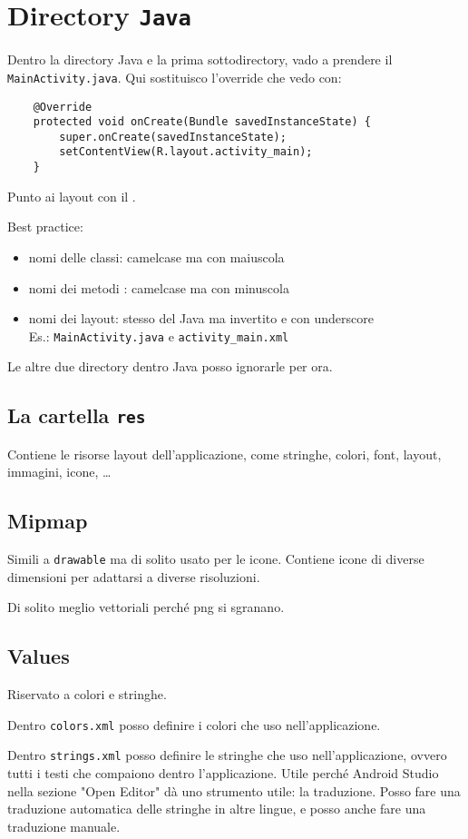 \section{Directory \texttt{Java}}
\par Dentro la directory Java e la prima sottodirectory, vado a prendere il \texttt{MainActivity.java}. Qui sostituisco l'override che vedo con:
\begin{verbatim}
    @Override
    protected void onCreate(Bundle savedInstanceState) {
        super.onCreate(savedInstanceState);
        setContentView(R.layout.activity_main);
    }
\end{verbatim}
\par Punto ai layout con il .
\par Best practice:
\begin{itemize}
    \item nomi delle classi: camelcase ma con maiuscola
    \item nomi dei metodi : camelcase ma con minuscola
    \item nomi dei layout: stesso del Java ma invertito e con underscore\\
    Es.: \texttt{MainActivity.java} e \texttt{activity\_main.xml}
\end{itemize}
\par Le altre due directory dentro Java posso ignorarle per ora.

\subsection{La cartella \texttt{res}}
\par Contiene le risorse layout dell'applicazione, come stringhe, colori, font, layout, immagini, icone, \dots

\subsection{Mipmap}
\par Simili a \texttt{drawable} ma di solito usato per le icone. Contiene icone di diverse dimensioni per adattarsi a diverse risoluzioni. 
\par Di solito meglio vettoriali perché png si sgranano.

\subsection{Values}
\par Riservato a colori e stringhe. 
\par Dentro \texttt{colors.xml} posso definire i colori che uso nell'applicazione.
\par Dentro \texttt{strings.xml} posso definire le stringhe che uso nell'applicazione, ovvero tutti i testi che compaiono dentro l'applicazione. Utile perché Android Studio nella sezione "Open Editor" dà uno strumento utile: la traduzione. Posso fare una traduzione automatica delle stringhe in altre lingue, e posso anche fare una traduzione manuale.

